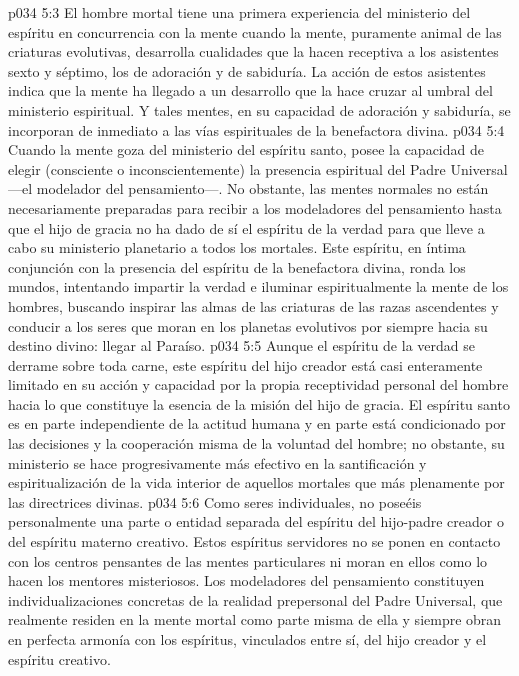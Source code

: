 \vs p034 5:3 \pc El hombre mortal tiene una primera experiencia del ministerio del espíritu en concurrencia con la mente cuando la mente, puramente animal de las criaturas evolutivas, desarrolla cualidades que la hacen receptiva a los asistentes sexto y séptimo, los de adoración y de sabiduría. La acción de estos asistentes indica que la mente ha llegado a un desarrollo que la hace cruzar al umbral del ministerio espiritual. Y tales mentes, en su capacidad de adoración y sabiduría, se incorporan de inmediato a las vías espirituales de la benefactora divina.
\vs p034 5:4 Cuando la mente goza del ministerio del espíritu santo, posee la capacidad de elegir (consciente o inconscientemente) la presencia espiritual del Padre Universal ---el modelador del pensamiento---. No obstante, las mentes normales no están necesariamente preparadas para recibir a los modeladores del pensamiento hasta que el hijo de gracia no ha dado de sí el espíritu de la verdad para que lleve a cabo su ministerio planetario a todos los mortales. Este espíritu, en íntima conjunción con la presencia del espíritu de la benefactora divina, ronda los mundos, intentando impartir la verdad e iluminar espiritualmente la mente de los hombres, buscando inspirar las almas de las criaturas de las razas ascendentes y conducir a los seres que moran en los planetas evolutivos por siempre hacia su destino divino: llegar al Paraíso.
\vs p034 5:5 Aunque el espíritu de la verdad se derrame sobre toda carne, este espíritu del hijo creador está casi enteramente limitado en su acción y capacidad por la propia receptividad personal del hombre hacia lo que constituye la esencia de la misión del hijo de gracia. El espíritu santo es en parte independiente de la actitud humana y en parte está condicionado por las decisiones y la cooperación misma de la voluntad del hombre; no obstante, su ministerio se hace progresivamente más efectivo en la santificación y espiritualización de la vida interior de aquellos mortales que más plenamente  por las directrices divinas.
\vs p034 5:6 \pc Como seres individuales, no poseéis personalmente una parte o entidad separada del espíritu del hijo\hyp{}padre creador o del espíritu materno creativo. Estos espíritus servidores no se ponen en contacto con los centros pensantes de las mentes particulares ni moran en ellos como lo hacen los mentores misteriosos. Los modeladores del pensamiento constituyen individualizaciones concretas de la realidad prepersonal del Padre Universal, que realmente residen en la mente mortal como parte misma de ella y siempre obran en perfecta armonía con los espíritus, vinculados entre sí, del hijo creador y el espíritu creativo.
